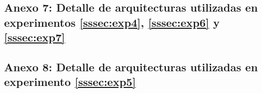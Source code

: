 \subsection{Anexo 7: Detalle de arquitecturas utilizadas en experimentos \ref{sssec:exp4}, \ref{sssec:exp6} y \ref{sssec:exp7}}\label{ssec:anexo7}

\subsection{Anexo 8: Detalle de arquitecturas utilizadas en experimento \ref{sssec:exp5}}\label{ssec:anexo8}

